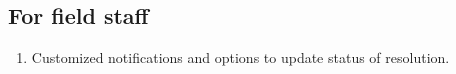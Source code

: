 \documentclass[paper=a4, fontsize=11pt]{scrartcl} %
\numberwithin{equation}{section} %
\numberwithin{figure}{section} %
\numberwithin{table}{section} %
\begin{document}
\subsection{For field staff}
\begin{enumerate}
\item
Customized notifications and options to update status of resolution.
\end{enumerate}
\end{document}
